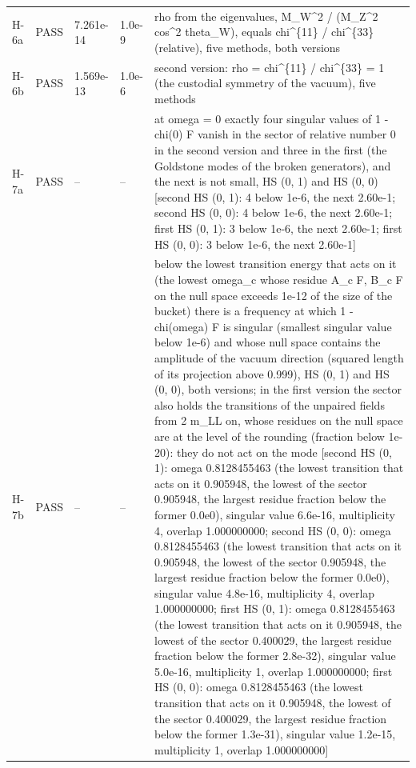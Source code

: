 \documentclass[aps,prd,onecolumn,superscriptaddress,nofootinbib,floatfix,longbibliography]{revtex4-2}
\begin{document}
\begin{longtable}{p{}p{}p{}p{}p{}}
H-6a & PASS & 7.261e-14 & 1.0e-9 & rho from the eigenvalues, M\_W\textasciicircum{}2 / (M\_Z\textasciicircum{}2 cos\textasciicircum{}2 theta\_W), equals chi\textasciicircum{}\{11\} / chi\textasciicircum{}\{33\} (relative), five methods, both versions \\
H-6b & PASS & 1.569e-13 & 1.0e-6 & second version: rho = chi\textasciicircum{}\{11\} / chi\textasciicircum{}\{33\} = 1 (the custodial symmetry of the vacuum), five methods \\
H-7a & PASS & -- & -- & at omega = 0 exactly four singular values of 1 - chi(0) F vanish in the sector of relative number 0 in the second version and three in the first (the Goldstone modes of the broken generators), and the next is not small, HS (0, 1) and HS (0, 0) [second HS (0, 1): 4 below 1e-6, the next 2.60e-1; second HS (0, 0): 4 below 1e-6, the next 2.60e-1; first HS (0, 1): 3 below 1e-6, the next 2.60e-1; first HS (0, 0): 3 below 1e-6, the next 2.60e-1] \\
H-7b & PASS & -- & -- & below the lowest transition energy that acts on it (the lowest omega\_c whose residue A\_c F, B\_c F on the null space exceeds 1e-12 of the size of the bucket) there is a frequency at which 1 - chi(omega) F is singular (smallest singular value below 1e-6) and whose null space contains the amplitude of the vacuum direction (squared length of its projection above 0.999), HS (0, 1) and HS (0, 0), both versions; in the first version the sector also holds the transitions of the unpaired fields from 2 m\_LL on, whose residues on the null space are at the level of the rounding (fraction below 1e-20): they do not act on the mode [second HS (0, 1): omega 0.8128455463 (the lowest transition that acts on it 0.905948, the lowest of the sector 0.905948, the largest residue fraction below the former 0.0e0), singular value 6.6e-16, multiplicity 4, overlap 1.000000000; second HS (0, 0): omega 0.8128455463 (the lowest transition that acts on it 0.905948, the lowest of the sector 0.905948, the largest residue fraction below the former 0.0e0), singular value 4.8e-16, multiplicity 4, overlap 1.000000000; first HS (0, 1): omega 0.8128455463 (the lowest transition that acts on it 0.905948, the lowest of the sector 0.400029, the largest residue fraction below the former 2.8e-32), singular value 5.0e-16, multiplicity 1, overlap 1.000000000; first HS (0, 0): omega 0.8128455463 (the lowest transition that acts on it 0.905948, the lowest of the sector 0.400029, the largest residue fraction below the former 1.3e-31), singular value 1.2e-15, multiplicity 1, overlap 1.000000000] \\

\end{longtable}
\end{document}
